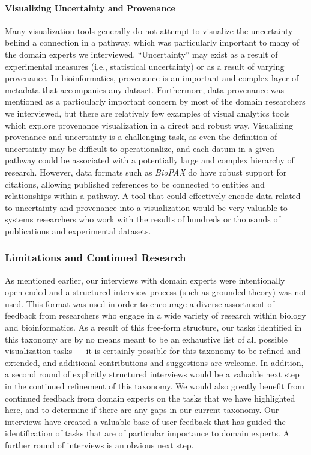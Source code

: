 \documentclass[twocolumn]{bmcart}%
\begin{document}
\paragraph{Visualizing Uncertainty and Provenance}

Many visualization tools generally do not attempt to visualize the uncertainty behind a connection in a pathway, which was particularly important to many of the domain experts we interviewed.
``Uncertainty'' may exist as a result of experimental measures (i.e., statistical uncertainty) or as a result of varying provenance.
In bioinformatics, provenance is an important and complex layer of metadata that accompanies any dataset.
Furthermore, data provenance was mentioned as a particularly important concern by most of the domain researchers we interviewed, but there are relatively few examples of visual analytics tools which explore provenance visualization in a direct and robust way.
Visualizing provenance and uncertainty is a challenging task, as even the definition of uncertainty may be difficult to operationalize, and each datum in a given pathway could be associated with a potentially large and complex hierarchy of research.
However, data formats such as \emph{BioPAX} do have robust support for citations, allowing published references to be connected to entities and relationships within a pathway.
A tool that could effectively encode data related to uncertainty and provenance into a visualization would be very valuable to systems researchers who work with the results of hundreds or thousands of publications and experimental datasets.

\subsubsection*{Limitations and Continued Research}

As mentioned earlier, our interviews with domain experts were intentionally open-ended and a structured interview process (such as grounded theory) was not used.
This format was used in order to encourage a diverse assortment of feedback from researchers who engage in a wide variety of research within biology and bioinformatics.
As a result of this free-form structure, our tasks identified in this taxonomy are by no means meant to be an exhaustive list of all possible visualization tasks --- it is certainly possible for this taxonomy to be refined and extended, and additional contributions and suggestions are welcome.
In addition, a second round of explicitly structured interviews would be a valuable next step in the continued refinement of this taxonomy.
We would also greatly benefit from continued feedback from domain experts on the tasks that we have highlighted here, and to determine if there are any gaps in our current taxonomy.
Our interviews have created a valuable base of user feedback that has guided the identification of tasks that are of particular importance to domain experts.
A further round of interviews is an obvious next step.
\end{document}
